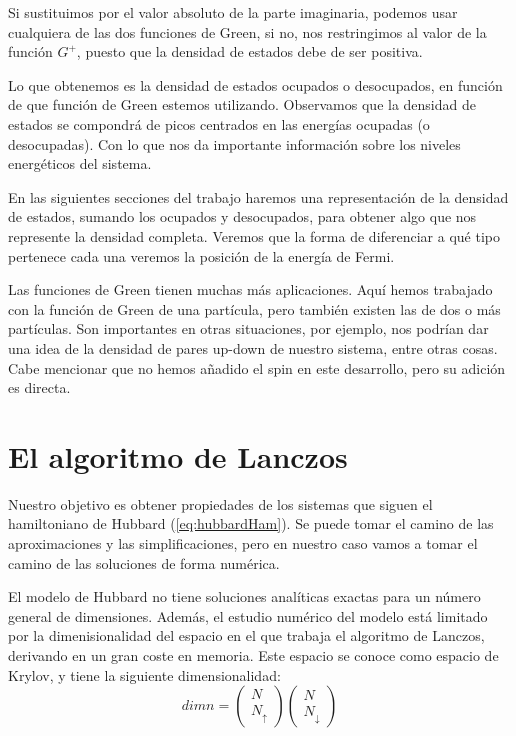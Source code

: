 \documentclass[12pt,twoside]{article}
\begin{document}
Si sustituimos por el valor absoluto de la parte imaginaria, podemos usar cualquiera de las dos funciones de Green, si no, nos restringimos al valor de la función $G^+$, puesto que la densidad de estados debe de ser positiva.

Lo que obtenemos es la densidad de estados ocupados o desocupados, en función de que función de Green estemos utilizando. Observamos que la densidad de estados se compondrá de picos centrados en las energías ocupadas (o desocupadas). Con lo que nos da importante información sobre los niveles energéticos del sistema.

En las siguientes secciones del trabajo haremos una representación de la densidad de estados, sumando los ocupados y desocupados, para obtener algo que nos represente la densidad completa. Veremos que la forma de diferenciar a qué tipo pertenece cada una veremos la posición de la energía de Fermi.

Las funciones de Green tienen muchas más aplicaciones. Aquí hemos trabajado con la función de Green de una partícula, pero también existen las de dos o más partículas. Son importantes en otras situaciones, por ejemplo, nos podrían dar una idea de la densidad de pares up-down de nuestro sistema, entre otras cosas. Cabe mencionar que no hemos añadido el spin en este desarrollo, pero su adición es directa.
\newpage
\section{El algoritmo de Lanczos}

Nuestro objetivo es obtener propiedades de los sistemas que siguen el hamiltoniano de Hubbard (\ref{eq:hubbardHam}). Se puede tomar el camino de las aproximaciones y las simplificaciones, pero en nuestro caso vamos a tomar el camino de las soluciones de forma numérica.

El modelo de Hubbard no tiene soluciones analíticas exactas para un número general de dimensiones. Además, el estudio numérico del modelo está limitado por la dimenisionalidad del espacio en el que trabaja el algoritmo de Lanczos, derivando en un gran coste en memoria. Este espacio se conoce como espacio de Krylov, y tiene la siguiente dimensionalidad:
$$
dimn = \left(\begin{array}{c}
  N \\
  N_{\uparrow}
\end{array}\right)\left(\begin{array}{c}
  N \\
  N_{\downarrow}
\end{array}\right)
$$
\end{document}
